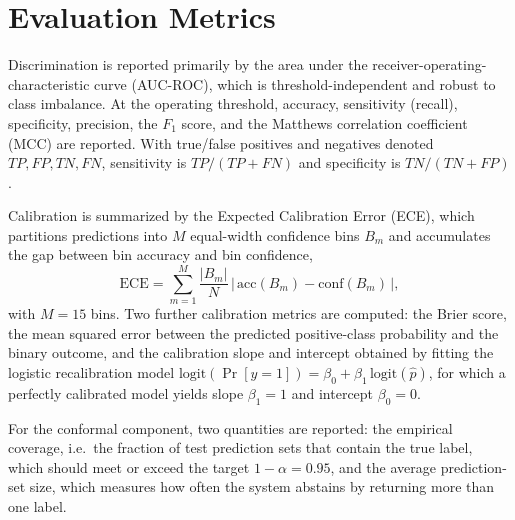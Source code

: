 \section{Evaluation Metrics}
\label{sec:metrics}
Discrimination is reported primarily by the area under the receiver-operating-characteristic curve (AUC-ROC), which is threshold-independent and robust to class imbalance. At the operating threshold, accuracy, sensitivity (recall), specificity, precision, the $F_1$ score, and the Matthews correlation coefficient (MCC) are reported. With true/false positives and negatives denoted $\mathit{TP}, \mathit{FP}, \mathit{TN}, \mathit{FN}$, sensitivity is $\mathit{TP}/(\mathit{TP}+\mathit{FN})$ and specificity is $\mathit{TN}/(\mathit{TN}+\mathit{FP})$.

Calibration is summarized by the Expected Calibration Error (ECE), which partitions predictions into $M$ equal-width confidence bins $B_m$ and accumulates the gap between bin accuracy and bin confidence,
\begin{equation}
    \mathrm{ECE} = \sum_{m=1}^{M} \frac{|B_m|}{N}\,\big|\, \mathrm{acc}(B_m) - \mathrm{conf}(B_m) \,\big|,
\end{equation}
with $M=15$ bins. Two further calibration metrics are computed: the Brier score, the mean squared error between the predicted positive-class probability and the binary outcome, and the calibration slope and intercept obtained by fitting the logistic recalibration model $\mathrm{logit}(\Pr[y=1]) = \beta_0 + \beta_1\,\mathrm{logit}(\hat{p})$, for which a perfectly calibrated model yields slope $\beta_1 = 1$ and intercept $\beta_0 = 0$.

For the conformal component, two quantities are reported: the empirical coverage, i.e.\ the fraction of test prediction sets that contain the true label, which should meet or exceed the target $1-\alpha = 0.95$, and the average prediction-set size, which measures how often the system abstains by returning more than one label.

